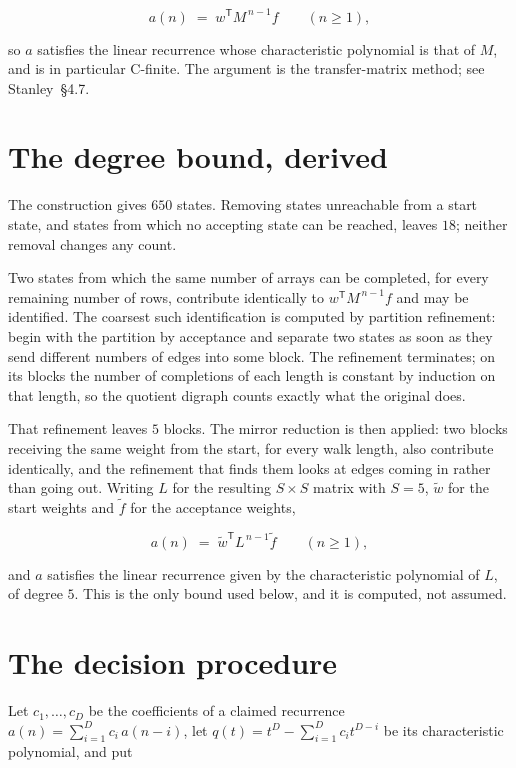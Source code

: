 \documentclass[11pt]{article}
\theoremstyle{definition}
\begin{document}
\[a(n) \;=\; w^{\mathsf T} M^{\,n-1} f \qquad (n \ge 1),\]

so $a$ satisfies the linear recurrence whose characteristic polynomial is that of $M$, and is in particular C-finite. The argument is the transfer-matrix method; see Stanley~\S4.7.

\section{The degree bound, derived}

The construction gives $650$ states. Removing states unreachable from a start state, and states from which no accepting state can be reached, leaves $18$; neither removal changes any count.

Two states from which the same number of arrays can be completed, for every remaining number of rows, contribute identically to $w^{\mathsf T}M^{\,n-1}f$ and may be identified. The coarsest such identification is computed by partition refinement: begin with the partition by acceptance and separate two states as soon as they send different numbers of edges into some block. The refinement terminates; on its blocks the number of completions of each length is constant by induction on that length, so the quotient digraph counts exactly what the original does.

That refinement leaves $5$ blocks. The mirror reduction is then applied: two blocks receiving the same weight from the start, for every walk length, also contribute identically, and the refinement that finds them looks at edges coming in rather than going out. Writing $L$ for the resulting $S \times S$ matrix with $S = 5$, $\tilde w$ for the start weights and $\tilde f$ for the acceptance weights,

\[a(n) \;=\; \tilde w^{\mathsf T} L^{\,n-1} \tilde f \qquad (n \ge 1),\]

and $a$ satisfies the linear recurrence given by the characteristic polynomial of $L$, of degree $5$. This is the only bound used below, and it is computed, not assumed.

\section{The decision procedure}

Let $c_1,\dots,c_D$ be the coefficients of a claimed recurrence $a(n) = \sum_{i=1}^{D} c_i\,a(n-i)$, let $q(t) = t^{D} - \sum_{i=1}^{D} c_i t^{D-i}$ be its characteristic polynomial, and put
\end{document}

